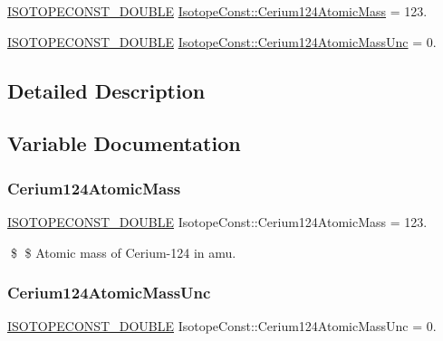 \begin{DoxyCompactItemize}
\item 
\mbox{\hyperlink{group___isotope_const-_macros_ga8f45a7272ce02c0b4c65c44636ed719a}{I\+S\+O\+T\+O\+P\+E\+C\+O\+N\+S\+T\+\_\+\+D\+O\+U\+B\+LE}} \mbox{\hyperlink{group___isotope_const-_cerium-_ce124_ga5f0dfbb1957263031370e5d5c9f94cd1}{Isotope\+Const\+::\+Cerium124\+Atomic\+Mass}} = 123.
\item 
\mbox{\hyperlink{group___isotope_const-_macros_ga8f45a7272ce02c0b4c65c44636ed719a}{I\+S\+O\+T\+O\+P\+E\+C\+O\+N\+S\+T\+\_\+\+D\+O\+U\+B\+LE}} \mbox{\hyperlink{group___isotope_const-_cerium-_ce124_gab0c2034e0cb08e4164b3a610f51cb689}{Isotope\+Const\+::\+Cerium124\+Atomic\+Mass\+Unc}} = 0.
\end{DoxyCompactItemize}


\subsection{Detailed Description}


\subsection{Variable Documentation}
\mbox{\label{group___isotope_const-_cerium-_ce124_ga5f0dfbb1957263031370e5d5c9f94cd1}} 
\subsubsection{\texorpdfstring{Cerium124\+Atomic\+Mass}{Cerium124AtomicMass}}
{\footnotesize\ttfamily \mbox{\hyperlink{group___isotope_const-_macros_ga8f45a7272ce02c0b4c65c44636ed719a}{I\+S\+O\+T\+O\+P\+E\+C\+O\+N\+S\+T\+\_\+\+D\+O\+U\+B\+LE}} Isotope\+Const\+::\+Cerium124\+Atomic\+Mass = 123.}

\$ \$ Atomic mass of Cerium-\/124 in amu. \mbox{\label{group___isotope_const-_cerium-_ce124_gab0c2034e0cb08e4164b3a610f51cb689}} 
\subsubsection{\texorpdfstring{Cerium124\+Atomic\+Mass\+Unc}{Cerium124AtomicMassUnc}}
{\footnotesize\ttfamily \mbox{\hyperlink{group___isotope_const-_macros_ga8f45a7272ce02c0b4c65c44636ed719a}{I\+S\+O\+T\+O\+P\+E\+C\+O\+N\+S\+T\+\_\+\+D\+O\+U\+B\+LE}} Isotope\+Const\+::\+Cerium124\+Atomic\+Mass\+Unc = 0.}

